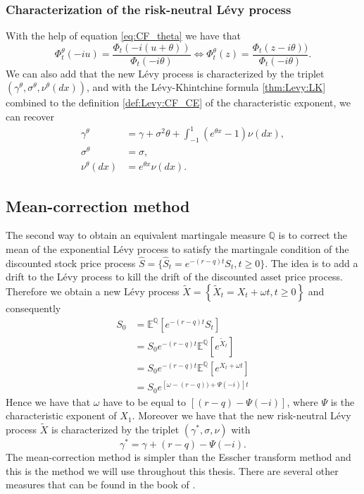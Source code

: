 \subsubsection*{Characterization of the risk-neutral L\'evy process}
With the help of equation \eqref{eq:CF_theta} we have that
$$\Phi_t^{\theta}(-iu) = \frac{\Phi_t(-i(u+\theta))}{\Phi_t(-i\theta)} \Longleftrightarrow \Phi_t^\theta(z)=\frac{\Phi_t(z-i\theta))}{\Phi_t(-i\theta)}.$$
We can also add that the new L\'evy process is characterized by the triplet $(\gamma^\theta,\sigma^\theta, \nu^\theta(dx))$, and with the L\'evy-Khintchine formula \ref{thm:Levy:LK} combined to the definition \eqref{def:Levy:CF_CE} of the characteristic exponent, we can recover
\begin{align*}
\gamma^\theta &= \gamma + \sigma^2 \theta + \int_{-1}^1 \left(e^{\theta x}-1\right)\nu(dx),\\
\sigma^\theta &= \sigma,\\
\nu^\theta(dx)&=e^{\theta x}\nu(dx).
\end{align*}

\subsection{Mean-correction method}
The second way to obtain an equivalent martingale measure $\mathbb{Q}$ is to correct the mean of the exponential L\'evy process to satisfy the martingale condition of the discounted stock price process $\hat{S}=\{\hat{S}_t=e^{-(r-q)t}S_t,t\geq0\}$. The idea is to add a drift to the L\'evy process to kill the drift of the discounted asset price process. Therefore we obtain a new L\'evy process $\tilde{X}=\left\{\tilde{X}_t=X_t+\omega t,t\geq0\right\}$ and consequently
\begin{align*}
S_0 &= \mathbb{E}^\mathbb{Q}\left[e^{-(r-q)t}S_t\right]\\
&= S_0e^{-(r-q)t} \mathbb{E}^\mathbb{Q}\left[e^{\tilde{X}_t}\right]\\
&=  S_0e^{-(r-q)t} \mathbb{E}^\mathbb{Q}\left[e^{X_t+\omega t}\right]\\
&= S_0e^{\left[\omega-(r-q)) + \Psi(-i)\right]t}
\end{align*}
Hence we have that $\omega$ have to be equal to $\left[(r-q)-\Psi(-i)\right]$, where $\Psi$ is the characteristic exponent of $X_1$. Moreover we have that the new risk-neutral L\'evy process $\tilde{X}$ is characterized by the triplet $(\gamma^\ast,\sigma,\nu)$ with
\begin{equation}\label{eq:rn_drift}
\gamma^\ast = \gamma + (r-q) - \Psi(-i).
\end{equation}
The mean-correction method is simpler than the Esscher transform method and this is the method we will use throughout this thesis. There are several other measures that can be found in the book of \citeauthor{Miy11} \citeyearpar{Miy11}.
